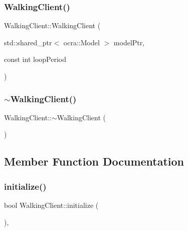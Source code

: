 \subsubsection{\texorpdfstring{Walking\+Client()}{WalkingClient()}}
{\footnotesize\ttfamily Walking\+Client\+::\+Walking\+Client (\begin{DoxyParamCaption}\item[{std\+::shared\+\_\+ptr$<$ ocra\+::\+Model $>$}]{model\+Ptr,  }\item[{const int}]{loop\+Period }\end{DoxyParamCaption})}

\hypertarget{classWalkingClient_a1dbc0308f844aea6542750104fddf8e2}{}\label{classWalkingClient_a1dbc0308f844aea6542750104fddf8e2} 
\subsubsection{\texorpdfstring{$\sim$\+Walking\+Client()}{~WalkingClient()}}
{\footnotesize\ttfamily Walking\+Client\+::$\sim$\+Walking\+Client (\begin{DoxyParamCaption}{ }\end{DoxyParamCaption})\hspace{0.3cm}{\ttfamily [virtual]}}



\subsection{Member Function Documentation}
\hypertarget{classWalkingClient_aba6a03fe29a4e947bc6bc0c09a713b2a}{}\label{classWalkingClient_aba6a03fe29a4e947bc6bc0c09a713b2a} 
\subsubsection{\texorpdfstring{initialize()}{initialize()}}
{\footnotesize\ttfamily bool Walking\+Client\+::initialize (\begin{DoxyParamCaption}{ }\end{DoxyParamCaption})\hspace{0.3cm}{\ttfamily [protected]}, {\ttfamily [virtual]}}

\hypertarget{classWalkingClient_afd997bb00534c57fe1b0d5f37f207386}{}\label{classWalkingClient_afd997bb00534c57fe1b0d5f37f207386} 
